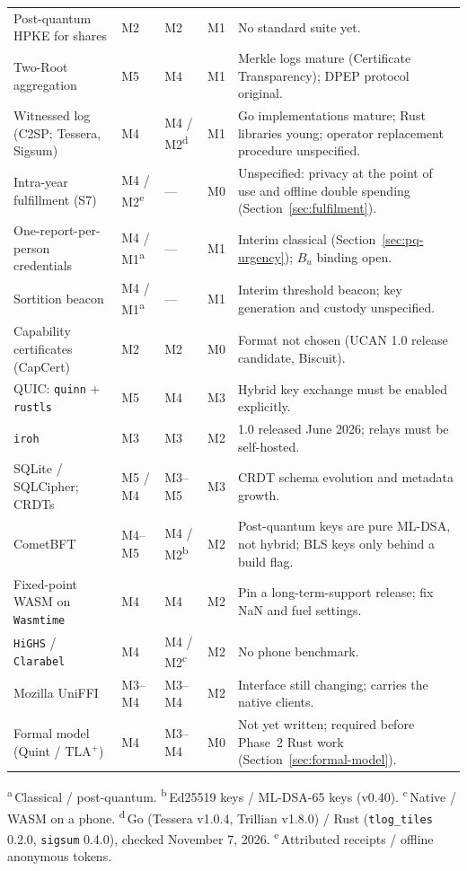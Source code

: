 \documentclass[10pt,twoside,openany]{book}
\theoremstyle{dpepstyle}
\begin{document}
{\begin{longtable}{L{1.30in} C{0.42in} C{0.62in} C{0.46in} L{1.70in}}
Post-quantum HPKE for shares & M2 & M2 & M1 & No standard suite yet. \\
Two-Root aggregation & M5 & M4 & M1 & Merkle logs mature (Certificate Transparency); DPEP protocol original. \\
Witnessed log (C2SP; Tessera, Sigsum) & M4 & M4 / M2\textsuperscript{d} & M1 & Go implementations mature; Rust libraries young; operator replacement procedure unspecified. \\
Intra-year fulfillment (S7) & M4 / M2\textsuperscript{e} & --- & M0 & Unspecified: privacy at the point of use and offline double spending (Section~\ref{sec:fulfilment}). \\
One-report-per-person credentials & M4 / M1\textsuperscript{a} & --- & M1 & Interim classical (Section~\ref{sec:pq-urgency}); $B_u$ binding open. \\
Sortition beacon & M4 / M1\textsuperscript{a} & --- & M1 & Interim threshold beacon; key generation and custody unspecified. \\
Capability certificates (CapCert) & M2 & M2 & M0 & Format not chosen (UCAN 1.0 release candidate, Biscuit). \\
QUIC: \texttt{quinn} + \texttt{rustls} & M5 & M4 & M3 & Hybrid key exchange must be enabled explicitly. \\
\texttt{iroh} & M3 & M3 & M2 & 1.0 released June 2026; relays must be self-hosted. \\
SQLite / SQLCipher; CRDTs & M5 / M4 & M3--M5 & M3 & CRDT schema evolution and metadata growth. \\
CometBFT & M4--M5 & M4 / M2\textsuperscript{b} & M2 & Post-quantum keys are pure ML-DSA, not hybrid; BLS keys only behind a build flag. \\
Fixed-point WASM on \texttt{Wasmtime} & M4 & M4 & M2 & Pin a long-term-support release; fix NaN and fuel settings. \\
\texttt{HiGHS} / \texttt{Clarabel} & M4 & M4 / M2\textsuperscript{c} & M2 & No phone benchmark. \\
Mozilla UniFFI & M3--M4 & M3--M4 & M2 & Interface still changing; carries the native clients. \\
Formal model (Quint / TLA$^+$) & M4 & M3--M4 & M0 & Not yet written; required before Phase~2 Rust work (Section~\ref{sec:formal-model}). \\
\end{longtable}
{\raggedright \textsuperscript{a}\,Classical / post-quantum. \textsuperscript{b}\,Ed25519 keys / ML-DSA-65 keys (v0.40). \textsuperscript{c}\,Native / WASM on a phone. \textsuperscript{d}\,Go (Tessera v1.0.4, Trillian v1.8.0) / Rust (\texttt{tlog\_tiles} 0.2.0, \texttt{sigsum} 0.4.0), checked November 7, 2026. \textsuperscript{e}\,Attributed receipts / offline anonymous tokens.\par}}
\end{document}
